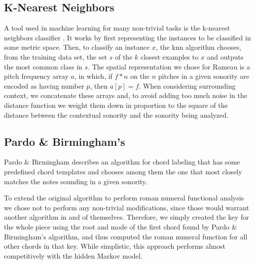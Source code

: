 
\subsection{K-Nearest Neighbors}
\label{sec:knn}


A tool used in machine learning for many non-trivial tasks is the
k-nearest neighbors classifier \cite{mitchell97:machine}. It works by
first representing the instances to be classified in some metric
space. Then, to classify an instance $x$, the knn algorithm chooses,
from the training data set, the set $s$ of the $k$ closest examples to
$x$ and outputs the most common class in $s$. The spatial
representation we chose for Rameau is a pitch frequency array $a$, in
which, if $f*n$ on the $n$ pitches in a given sonority are encoded as
having number $p$, then $a[p] = f$. When considering surrounding
context, we concatenate these arrays and, to avoid adding too much
noise in the distance function we weight them down in proportion to
the square of the distance between the contextual sonority and the
sonority being analyzed.

\subsection{Pardo \& Birmingham's}
\label{sec:pardo--birminghams}

Pardo \& Birmingham \cite{pardo.ea99:automated} describes an algorithm
for chord labeling that has some predefined chord templates and
chooses among them the one that most closely matches the notes
sounding in a given sonority.

To extend the original algorithm to perform roman numeral functional
analysis we chose not to perform any non-trivial modifications, since
those would warrant another algorithm in and of themselves. Therefore,
we simply created the key for the whole piece using the root and mode
of the first chord found by Pardo \& Birmingham's algorithm, and
thus computed the roman numeral function for all other chords in that
key. While simplistic, this approach performs almost competitively
with the hidden Markov model.


